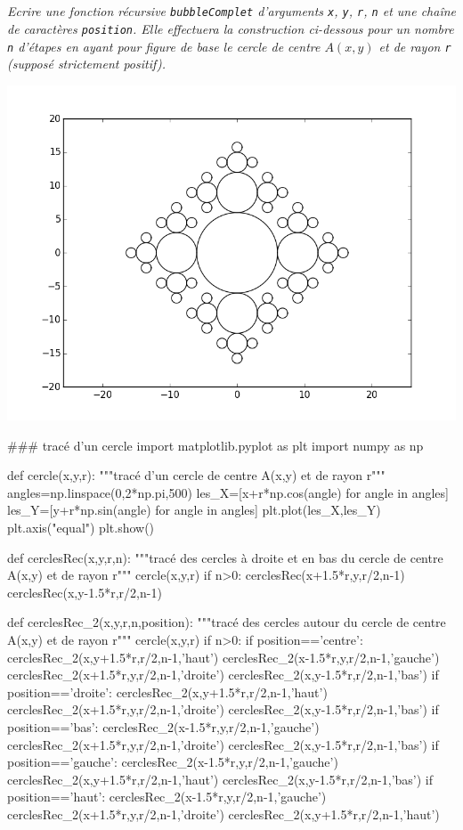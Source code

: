 \subparagraph{}
\textit{Ecrire une fonction récursive \texttt{bubbleComplet} d'arguments \texttt{x}, \texttt{y}, \texttt{r}, \texttt{n} 
et une chaîne de caractères \texttt{position}. Elle effectuera la construction ci-dessous pour un nombre \texttt{n} 
d'étapes en ayant pour figure de base le cercle de centre $A(x, y)$ et de rayon \texttt{r} (supposé strictement 
positif).}
\begin{center}
\includegraphics[width=.65\linewidth]{images/bulles}
\end{center}

\ifprof
\begin{corrige}
\begin{python}
### tracé d'un cercle
import matplotlib.pyplot as plt
import numpy as np

def cercle(x,y,r):
    """tracé d'un cercle de centre A(x,y) et de rayon r"""
    angles=np.linspace(0,2*np.pi,500)
    les_X=[x+r*np.cos(angle) for angle in angles]
    les_Y=[y+r*np.sin(angle) for angle in angles]
    plt.plot(les_X,les_Y)
    plt.axis("equal")
    plt.show()
    
def cerclesRec(x,y,r,n):
    """tracé des cercles à droite et en bas du cercle de centre A(x,y) et de rayon r"""
    cercle(x,y,r)
    if n>0:
        cerclesRec(x+1.5*r,y,r/2,n-1)
        cerclesRec(x,y-1.5*r,r/2,n-1)
        
def cerclesRec_2(x,y,r,n,position):
    """tracé des cercles autour du cercle de centre A(x,y) et de rayon r"""
    cercle(x,y,r)
    if n>0:
        if position=='centre':
            cerclesRec_2(x,y+1.5*r,r/2,n-1,'haut')
            cerclesRec_2(x-1.5*r,y,r/2,n-1,'gauche')
            cerclesRec_2(x+1.5*r,y,r/2,n-1,'droite')
            cerclesRec_2(x,y-1.5*r,r/2,n-1,'bas')
        if position=='droite':
            cerclesRec_2(x,y+1.5*r,r/2,n-1,'haut')
            cerclesRec_2(x+1.5*r,y,r/2,n-1,'droite')
            cerclesRec_2(x,y-1.5*r,r/2,n-1,'bas')
        if position=='bas':
            cerclesRec_2(x-1.5*r,y,r/2,n-1,'gauche')
            cerclesRec_2(x+1.5*r,y,r/2,n-1,'droite')
            cerclesRec_2(x,y-1.5*r,r/2,n-1,'bas')
        if position=='gauche':
            cerclesRec_2(x-1.5*r,y,r/2,n-1,'gauche')
            cerclesRec_2(x,y+1.5*r,r/2,n-1,'haut')
            cerclesRec_2(x,y-1.5*r,r/2,n-1,'bas')
        if position=='haut':
            cerclesRec_2(x-1.5*r,y,r/2,n-1,'gauche')
            cerclesRec_2(x+1.5*r,y,r/2,n-1,'droite')
            cerclesRec_2(x,y+1.5*r,r/2,n-1,'haut')
\end{python}
\end{corrige}
\else
\fi


